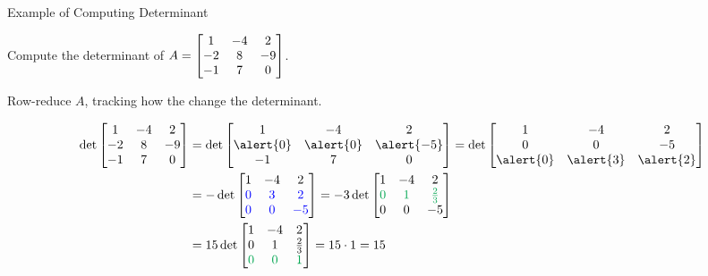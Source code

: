 \documentclass[xcolor=dvipsnames,aspectratio=169,t]{beamer}
\begin{document}
\begin{frame}{Example of Computing Determinant}

  Compute the determinant of $\displaystyle A = \begin{bmatrix} 1 & -4 & 2  \\
  -2 & 8 & -9 \\
  -1 &  7  & 0 \end{bmatrix}$.
  \bigskip

  \pause
  \alert{Row-reduce} $A$, tracking how the  change the determinant.

  \begin{align*}
  \det \begin{bmatrix} 1 & -4 & 2  \\
  -2 & 8 & -9 \\
  -1 &  7  & 0 \end{bmatrix} &= 
  \det  \begin{bmatrix} 1 & -4 & 2  \\
  \alert{0} & \alert{0} & \alert{-5} \\
  -1 &  7  & 0 \end{bmatrix}  = 
  \det \begin{bmatrix} 1 & -4 & 2  \\
  0 & 0 & -5 \\
  \alert{0} &  \alert{3}  & \alert{2} \end{bmatrix} \\
  &= 
  - \det  \begin{bmatrix} 1 & -4 & 2  \\
  \colorb{0} &  \colorb{3}  & \colorb{2} \\
  \colorb{0} & \colorb{0} & \colorb{-5} \end{bmatrix}
  =
  - 3 \det  \begin{bmatrix} 1 & -4 & 2  \\
  \green{0} &  \green{1}  & \green{\frac{2}{3}} \\
  0 & 0 & -5 \end{bmatrix} \\
  &=
  15 \det  \begin{bmatrix} 1 & -4 & 2  \\
  0 &  1  & \frac{2}{3} \\
  \green{0} & \green{0} & \green{1} \end{bmatrix}
  =15 \cdot 1
  =15
  \end{align*}

\end{frame}
\end{document}
